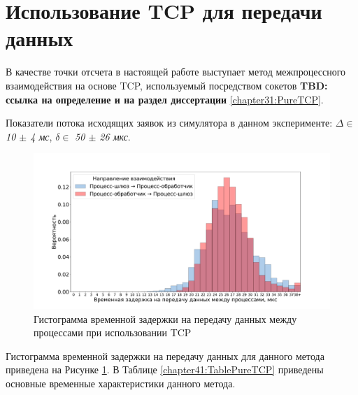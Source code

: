 \section{Использование TCP для передачи данных}


В качестве точки отсчета в настоящей работе выступает метод межпроцессного взаимодействия на основе TCP, используемый посредством сокетов \textbf{TBD: ссылка на определение и на раздел диссертации} \ref{chapter31:PureTCP}.

Показатели потока исходящих заявок из симулятора в данном эксперименте: $\Delta \in$ \textit{10 $\pm$ 4 мс}, $\delta \in$ \textit{50 $\pm$ 26 мкс}.

\begin{figure}[!h]
\caption{Гистограмма временной задержки на передачу данных между процессами при использовании TCP}
\label{chapter41:FigPureTCP}
\includegraphics[width=\textwidth]{../../graphics/hist/PureTCP}
\end{figure}

Гистограмма временной задержки на передачу данных для данного метода приведена на Рисунке \ref{chapter41:FigPureTCP}. В Таблице \ref{chapter41:TablePureTCP} приведены основные временные характеристики данного метода.

